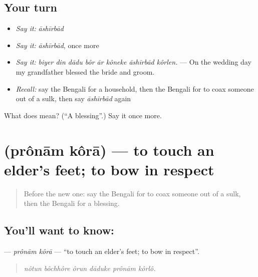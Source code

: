 \subsection*{Your turn}
\begin{itemize}
\raggedright
  \item \emph{Say it:} \emph{āshīrbād}
  \item \emph{Say it:} \emph{āshīrbād}, once more
  \item \emph{Say it:} \emph{biyer din dādu bôr ār kôneke āshīrbād kôrlen.} — On the wedding day my grandfather blessed the bride and groom.
  \item \emph{Recall:} say the Bengali for a household, then the Bengali for to coax someone out of a sulk, then say \emph{āshīrbād} again
\end{itemize}

\begin{tcolorbox}[breakable,colback=teal!4,colframe=teal!35!black,title={Before you move on}]
What does  mean? (\textquotedblleft{}A blessing\textquotedblright{}.) Say it once more.
\end{tcolorbox}
\section[\texorpdfstring{\bn{প্রণাম} \bn{করা} (prônām kôrā)}{প্রণাম করা (prônām kôrā)}]{  (prônām kôrā) — to touch an elder's feet; to bow in respect}

\label{lesson:BN-C489-pronam-kora}



\begin{quote}
Before the new one: say the Bengali for to coax someone out of a sulk, then the Bengali for a blessing.
\end{quote}

\subsection*{You'll want to know:  }
\textbf{ } — \emph{prônām kôrā} — \textquotedblleft{}to touch an elder's feet; to bow in respect\textquotedblright{}.

\begin{quote}
     
\end{quote}

\begin{quote}
\emph{nôtun bôchhôre ôrun dāduke prônām kôrlô.}
\end{quote}

